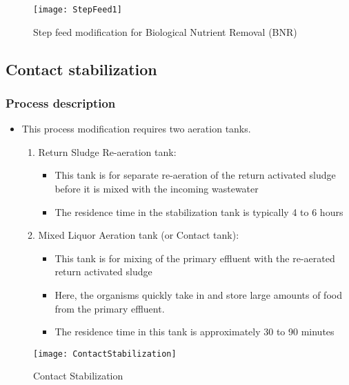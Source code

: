 \begin{figure}[h!]
\begin{center}
\texttt{[image: StepFeed1]}\\
\caption{Step feed modification for Biological Nutrient Removal (BNR)}
\end{center}
\end{figure}

		\subsection{Contact stabilization}


\subsubsection{Process description}
\begin{itemize}
\item This process modification requires two aeration tanks. 
\begin{enumerate}
\item Return Sludge Re-aeration tank:\\
\begin{itemize}
\item This tank is for separate re-aeration of the return activated sludge before it is mixed with the incoming wastewater
\item The residence time in the stabilization tank is typically 4 to 6 hours
\end{itemize}
\item Mixed Liquor Aeration tank (or Contact tank):\\
\begin{itemize}
\item This tank is for mixing of the primary effluent with the re-aerated return activated sludge
\item Here, the organisms quickly take in and store large amounts of food from the primary effluent.
\item The residence time in this tank is approximately 30 to 90 minutes
\end{itemize} 
\end{enumerate}
\end{itemize} 

\begin{figure}[h!]
\begin{center}
\texttt{[image: ContactStabilization]}
\caption{Contact Stabilization}
\end{center}
\end{figure}


